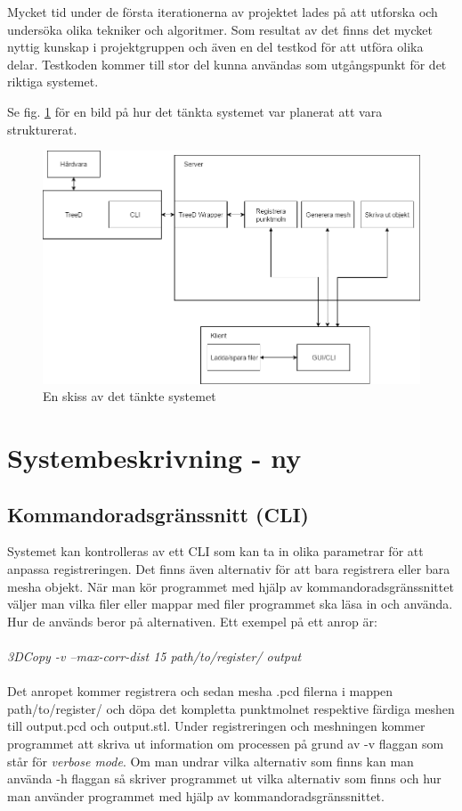 Mycket tid under de första iterationerna av projektet  lades på att utforska och undersöka olika tekniker och algoritmer. Som resultat av det finns det mycket nyttig kunskap i projektgruppen och även en del testkod för att utföra olika delar. Testkoden kommer till stor del kunna användas som utgångspunkt för det riktiga systemet.

Se fig. \ref{fig:systembeskrivning_gamla} för en bild på hur det tänkta systemet var planerat att vara strukturerat.

\begin{figure}[H]
	\centering
	\includegraphics[width=130mm]{figures/Systemskiss_gamla.png}
	\caption{En skiss av det tänkte systemet}
	\label{fig:systembeskrivning_gamla}
\end{figure}


\section{Systembeskrivning - ny}
\subsection{Kommandoradsgränssnitt (CLI)}

Systemet kan kontrolleras av ett CLI som kan ta in olika parametrar för att anpassa registreringen. Det finns även alternativ för att bara registrera eller bara mesha objekt. När man kör programmet med hjälp av kommandoradsgränssnittet väljer man vilka filer eller mappar med filer programmet ska läsa in och använda. Hur de används beror på alternativen. Ett exempel på ett anrop är:\\\\
\textit{3DCopy -v --max-corr-dist 15 path/to/register/ output}\\\\
Det anropet kommer registrera och sedan mesha .pcd filerna i mappen path/to/register/ och döpa det kompletta punktmolnet respektive färdiga meshen till output.pcd och output.stl. Under registreringen och meshningen kommer programmet att skriva ut information om processen på grund av -v flaggan som står för \textit{verbose mode}. Om man undrar vilka alternativ som finns kan man använda -h flaggan så skriver programmet ut vilka alternativ som finns och hur man använder programmet med hjälp av kommandoradsgränssnittet. 

